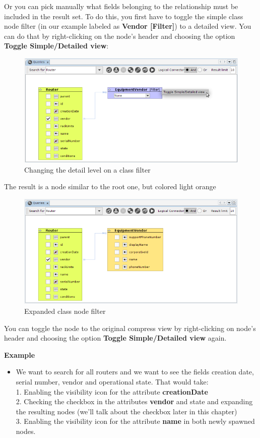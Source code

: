 \documentclass[a4paper]{article}
\begin{document}
	Or you can pick manually what fields belonging to the relationship must be included in the result set. To do this, you first have to toggle the simple class node filter (in our example labeled as \textbf{Vendor [Filter]}) to a detailed view. You can do that by right-clicking on the node's header and choosing the option \textbf{Toggle Simple/Detailed view}:
	\begin{figure}[h!]
		\centering
		\includegraphics[width=0.9\linewidth]{img/query_toggle_detail_view.png}
		\caption{Changing the detail level on a class filter}
		\label{fig:query_toggle_detail_view}
	\end{figure}
	
	The result is a node similar to the root one, but colored light orange
	\begin{figure}[h!]
		\centering
		\includegraphics[width=0.8\linewidth]{img/query_detail_view.png}
		\caption{Expanded class node filter}
		\label{fig:query_detail_view}
	\end{figure}
	
	You can toggle the node to the original compress view by right-clicking on node's header and choosing the option \textbf{Toggle Simple/Detailed view} again.
	
	\begin{framed} {\large \textbf{Example}}
		\begin{itemize}
			\item We want to search for all routers and we want to see the fields creation date, serial number, vendor and operational state. That would take:
			\\1. Enabling the visibility icon for the attribute \textbf{creationDate}
			\\2. Checking the checkbox in the attributes  \textbf{vendor} and state and expanding the resulting nodes (we'll talk about the checkbox later in this chapter)
			\\3. Enabling the visibility icon for the attribute  \textbf{name} in both newly spawned nodes.
		\end{itemize}
	\end{framed}
	
\end{document}
